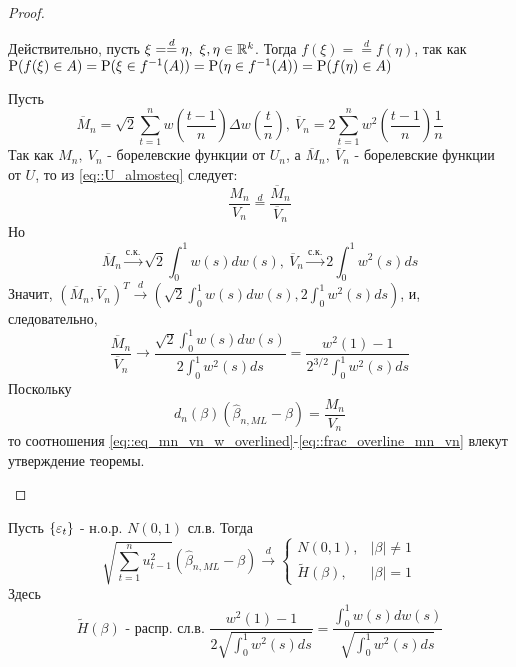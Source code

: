 \begin{proof}
\begin{enumerate}
\begin{leftbar}
            Действительно, пусть $\xi=\overset{d}{=}\eta,\ \xi,\eta\in\R^k$. Тогда $f(\xi)=\overset{d}{=}f(\eta)$,
            так как $\P(f(\xi)\in A)=\P(\xi\in f^{-1}(A))=\P(\eta\in f^{-1}(A))=\P(f(\eta)\in A)$
        \end{leftbar}
        Пусть
        \[\overline{M}_n=\sqrt{2}\sum_{t=1}^nw\left(\frac{t-1}{n}\right)\Delta w\left(\frac{t}{n}\right),\ \overline{V}_n=2\sum_{t=1}^nw^2\left(\frac{t-1}{n}\right)\frac{1}{n}\]
        Так как $M_n,\ V_n$ - борелевские функции от $U_n$, а $\overline{M}_n,\ \overline{V}_n$ - борелевские функции от $U$,
        то из \eqref{eq::U_almosteq} следует:
        \begin{equation}\label{eq::eq_mn_vn_w_overlined}
            \frac{M_n}{V_n}\overset{d}{=}\frac{\overline{M}_n}{\overline{V}_n}
        \end{equation}
        Но
        \[\overline{M}_n\xrightarrow{\text{с.к.}}\sqrt{2}\int_0^1w(s)dw(s),\ \overline{V}_n\xrightarrow{\text{с.к.}}2\int_0^1w^2(s)ds\]
        Значит, $(\overline{M}_n,\overline{V}_n)^T\xrightarrow{d}\left(\sqrt{2}\int_0^1w(s)dw(s), 2\int_0^1w^2(s)ds\right)$,
        и, следовательно,
        \begin{equation}\label{eq::frac_overline_mn_vn}
            \frac{\overline{M}_n}{\overline{V}_n}\rightarrow\frac{\sqrt{2}\int_0^1w(s)dw(s)}{2\int_0^1w^2(s)ds}=\frac{w^2(1)-1}{2^{3/2}\int^1_0w^2(s)ds}
        \end{equation}
        Поскольку
        \[d_n(\beta)(\widehat{\beta}_{n,ML}-\beta)=\frac{M_n}{V_n}\]
        то соотношения \eqref{eq::eq_mn_vn_w_overlined}-\eqref{eq::frac_overline_mn_vn} влекут утверждение
        теоремы.
    \end{enumerate}
\end{proof}
\begin{theorem}
    Пусть $\{\eps_t\}$ - н.о.р. $N(0,1)$ сл.в. Тогда
    \[\sqrt{\sum_{t=1}^nu^2_{t-1}}(\widehat{\beta}_{n,ML}-\beta)\xrightarrow{d}\begin{cases}
        N(0,1),& \left\lvert \beta\right\rvert \neq1\\
        \widetilde{H}(\beta),& \left\lvert \beta\right\rvert =1
    \end{cases}\]
    Здесь
    \[\widetilde{H}(\beta)\text{ - распр. сл.в. }\frac{w^2(1)-1}{2\sqrt{\int_0^1w^2(s)ds}}=\frac{\int_0^1w(s)dw(s)}{\sqrt{\int^1_0w^2(s)ds}}\]
\end{theorem}
